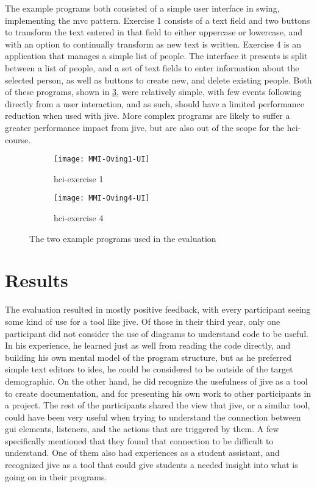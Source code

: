 The example programs both consisted of a simple user interface in swing, implementing the \gls{mvc} pattern.
Exercise 1 consists of a text field and two buttons to transform the text entered in that field to either uppercase or lowercase, and with an option to continually transform as new text is written.
Exercise 4 is an application that manages a simple list of people.
The interface it presents is split between a list of people, and a set of text fields to enter information about the selected person, as well as buttons to create new, and delete existing people.
Both of these programs, shown in \cref{fig:MMI-Oving-UI}, were relatively simple, with few events following directly from a user interaction, and as such, should have a limited performance reduction when used with \gls{jive}.
More complex programs are likely to suffer a greater performance impact from \gls{jive}, but are also out of the scope for the \gls{hci}-course.


\begin{figure}[H]
	\centering
	\begin{subfigure}{\textwidth}
		\centering
		\texttt{[image: MMI-Oving1-UI]}
		\caption{\gls{hci}-exercise 1}
		\label{fig:MMI-Oving1-UI}
	\end{subfigure}
	\begin{subfigure}{\textwidth}
		\centering
		\texttt{[image: MMI-Oving4-UI]}
		\caption{\gls{hci}-exercise 4}
		\label{fig:MMI-Oving4-UI}
	\end{subfigure}
	\caption{The two example programs used in the evaluation}
	\label{fig:MMI-Oving-UI}
\end{figure}

\section{Results}\label{jiveEvalResults}

The evaluation resulted in mostly positive feedback, with every participant seeing some kind of use for a tool like \gls{jive}.
Of those in their third year, only one participant did not consider the use of diagrams to understand code to be useful.
In his experience, he learned just as well from reading the code directly, and building his own mental model of the program structure, but as he preferred simple text editors to \gls{ide}s, he could be considered to be outside of the target demographic.
On the other hand, he did recognize the usefulness of \gls{jive} as a tool to create documentation, and for presenting his own work to other participants in a project.
The rest of the participants shared the view that \gls{jive}, or a similar tool, could have been very useful when trying to understand the connection between \gls{gui} elements, listeners, and the actions that are triggered by them.
A few specifically mentioned that they found that connection to be difficult to understand.
One of them also had experiences as a student assistant, and recognized \gls{jive} as a tool that could give students a needed insight into what is going on in their programs.

